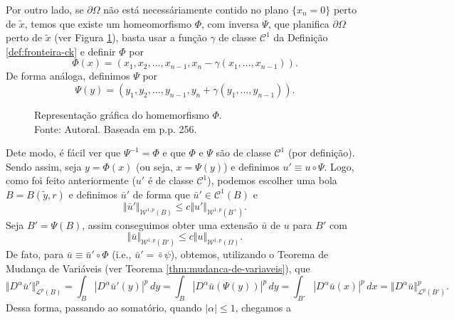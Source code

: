 \documentclass[a4paper, 11pt]{book}
\theoremstyle{definition}
\newcommand{\cC}{\mathcal{C}}
\newcommand{\cL}{\mathcal{L}}
\newcommand{\cW}{\mathcal{W}}
\begin{document}
\begin{prf}
    Por outro lado, se $\partial\Omega$ não está necessáriamente contido no plano $\{x_n = 0\}$ perto de $\tilde x$, temos que existe um homeomorfismo $\Phi$, com inversa $\Psi$, que planifica $\partial \Omega$ perto de $\tilde x$ (ver Figura \ref{fig:homeomorfismo}),  basta usar a função $\gamma$ de classe $\cC^1$ da Definição \ref{def:fronteira-ck} e definir $\Phi$ por
    \begin{equation} \label{eq:Phi}
        \Phi(x) = (x_1,x_2,...,x_{n-1}, x_n - \gamma(x_1,\dots,x_{n-1})).
    \end{equation}
    De forma análoga, definimos $\Psi$ por
    \begin{equation} \label{eq:Psi}
        \Psi(y) = (y_1,y_2,\dots,y_{n-1},y_n + \gamma(y_1,\dots,y_{n-1})).
    \end{equation}
    \begin{figure}
        \centering
        
        \caption{Representação gráfica do homemorfismo $\Phi$.\\Fonte: Autoral. Baseada em \cite{evans-pde} p.p. 256.}
        \label{fig:homeomorfismo}
    \end{figure}
    Dete modo, é fácil ver que $\Psi^{-1} = \Phi$ e que $\Phi$ e $\Psi$ são de classe $\cC^1$ (por definição). Sendo assim, seja $y = \Phi(x)$ (ou seja, $x = \Psi(y)$) e definimos $u' \equiv u \circ \Psi$. Logo, como foi feito anteriormente ($u'$ é de classe $\cC^1$), podemos escolher uma bola $B = B(\tilde y, r)$ e definimos $\bar u'$ de forma que $\bar u' \in \cC^1(B)$ e
    \begin{equation} \label{eq:BBBB}
        \Vert \bar u' \Vert_{\cW^{1,p}(B)} \leqslant c \Vert u' \Vert_{\cW^{1,p}(B^+)}.
    \end{equation}
    Seja $B' = \Psi(B)$, assim conseguimos obter uma extensão $\bar u$ de $u$ para $B'$ com
    \[
        \Vert \bar u \Vert_{\cW^{1,p}(B')} \leqslant c \Vert u \Vert_{\cW^{1,p}(\Omega)}.
    \]
    De fato, para $\bar u \equiv \bar u' \circ \Phi$ (i.e., $\bar u' = \bar \circ \psi$), obtemos, utilizando o Teorema de Mudança de Variáveis (ver Teorema \ref{thm:mudanca-de-variaveis}), que
    \[
        \Vert D^\alpha \bar u' \Vert_{\cL^p(B)}^p = \int_B |D^\alpha \bar u'(y)|^p \,dy = \int_B |D^\alpha \bar u (\Psi (y))|^p \,dy = \int_{B'} |D^\alpha \bar u (x)|^p \,dx = \Vert D^\alpha \bar u \Vert_{\cL^p(B')}^p.
    \]
    Dessa forma, passando ao somatório, quando $|\alpha| \leqslant 1$, chegamos a
    \begin{equation} \label{eq:normaBigualnormaW}

\end{equation}
\end{prf}
\end{document}
